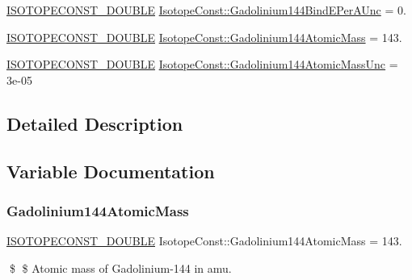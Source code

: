 \begin{DoxyCompactItemize}
\item 
\mbox{\hyperlink{group___isotope_const-_macros_ga8f45a7272ce02c0b4c65c44636ed719a}{I\+S\+O\+T\+O\+P\+E\+C\+O\+N\+S\+T\+\_\+\+D\+O\+U\+B\+LE}} \mbox{\hyperlink{group___isotope_const-_gadolinium-_gd144_ga75b80c9b633d84499f27d6bc9b35378d}{Isotope\+Const\+::\+Gadolinium144\+Bind\+E\+Per\+A\+Unc}} = 0.
\item 
\mbox{\hyperlink{group___isotope_const-_macros_ga8f45a7272ce02c0b4c65c44636ed719a}{I\+S\+O\+T\+O\+P\+E\+C\+O\+N\+S\+T\+\_\+\+D\+O\+U\+B\+LE}} \mbox{\hyperlink{group___isotope_const-_gadolinium-_gd144_gad8d052b9fee1df7f9e2fe3e3181b7622}{Isotope\+Const\+::\+Gadolinium144\+Atomic\+Mass}} = 143.
\item 
\mbox{\hyperlink{group___isotope_const-_macros_ga8f45a7272ce02c0b4c65c44636ed719a}{I\+S\+O\+T\+O\+P\+E\+C\+O\+N\+S\+T\+\_\+\+D\+O\+U\+B\+LE}} \mbox{\hyperlink{group___isotope_const-_gadolinium-_gd144_ga2bc8b863ddfaefa2ee16cca68482c0e1}{Isotope\+Const\+::\+Gadolinium144\+Atomic\+Mass\+Unc}} = 3e-\/05
\end{DoxyCompactItemize}


\subsection{Detailed Description}


\subsection{Variable Documentation}
\mbox{\label{group___isotope_const-_gadolinium-_gd144_gad8d052b9fee1df7f9e2fe3e3181b7622}} 
\subsubsection{\texorpdfstring{Gadolinium144\+Atomic\+Mass}{Gadolinium144AtomicMass}}
{\footnotesize\ttfamily \mbox{\hyperlink{group___isotope_const-_macros_ga8f45a7272ce02c0b4c65c44636ed719a}{I\+S\+O\+T\+O\+P\+E\+C\+O\+N\+S\+T\+\_\+\+D\+O\+U\+B\+LE}} Isotope\+Const\+::\+Gadolinium144\+Atomic\+Mass = 143.}

\$ \$ Atomic mass of Gadolinium-\/144 in amu. \mbox{\label{group___isotope_const-_gadolinium-_gd144_ga2bc8b863ddfaefa2ee16cca68482c0e1}} 
